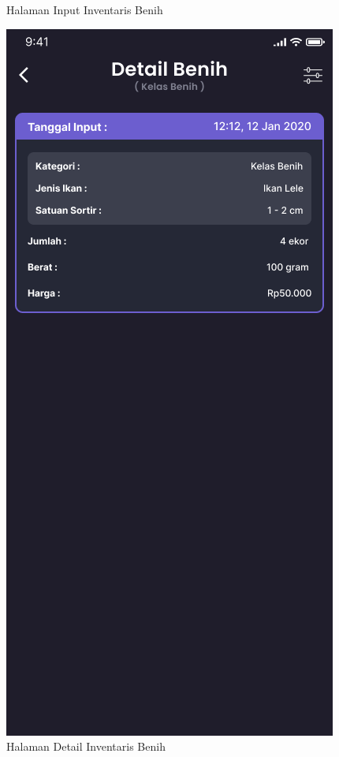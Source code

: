 \begin{spacing}{1.5}
\begin{figure}[H]
			\caption{Halaman Input Inventaris Benih}
		\endminipage\hfill
			\includegraphics[width=\linewidth]{gambar/sprint1/mockup_list_seed.png}
			\caption{Halaman Detail Inventaris Benih}
		\endminipage
	\end{figure}


\end{spacing}
